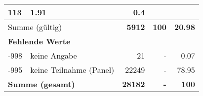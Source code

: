 \begin{longtable}{lXrrr}
       \num{113} &
       \num[round-mode=places,round-precision=2]{1,91} &
         \num[round-mode=places,round-precision=2]{0,4} \\
     \midrule
     \multicolumn{2}{l}{Summe (gültig)} &
       \textbf{\num{5912}} &
     \textbf{100} &
       \textbf{\num[round-mode=places,round-precision=2]{20,98}} \\
     \multicolumn{5}{l}{\textbf{Fehlende Werte}}\\
       -998 &
       keine Angabe &
         \num{21} &
        - &
         \num[round-mode=places,round-precision=2]{0,07} \\
       -995 &
       keine Teilnahme (Panel) &
         \num{22249} &
        - &
         \num[round-mode=places,round-precision=2]{78,95} \\
     \midrule
     \multicolumn{2}{l}{\textbf{Summe (gesamt)}} &
          \textbf{\num{28182}} &
        \textbf{-} &
        \textbf{100} \\
     \bottomrule
     \end{longtable}
     
